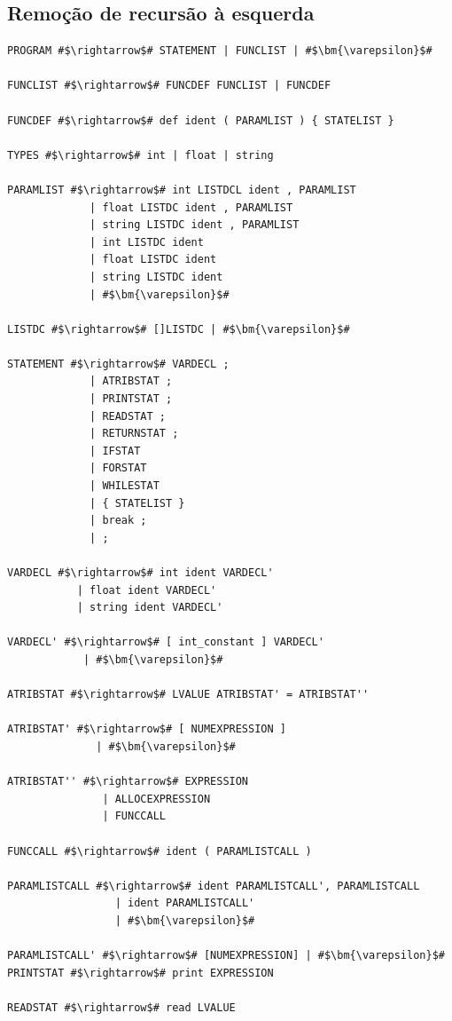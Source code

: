 \documentclass[
	12pt,				%
	openright,			%
	twoside,			%
	a4paper,			%
	english,			%
	french,				%
	spanish,			%
	brazil				%
	]{abntex2}
\begin{document}
\subsection{Remoção de recursão à esquerda}
\begin{lstlisting}[escapechar=\#]
PROGRAM #$\rightarrow$# STATEMENT | FUNCLIST | #$\bm{\varepsilon}$# 

FUNCLIST #$\rightarrow$# FUNCDEF FUNCLIST | FUNCDEF 

FUNCDEF #$\rightarrow$# def ident ( PARAMLIST ) { STATELIST } 

TYPES #$\rightarrow$# int | float | string 

PARAMLIST #$\rightarrow$# int LISTDCL ident , PARAMLIST 
             | float LISTDC ident , PARAMLIST 
             | string LISTDC ident , PARAMLIST 
             | int LISTDC ident  
             | float LISTDC ident 
             | string LISTDC ident 
             | #$\bm{\varepsilon}$# 

LISTDC #$\rightarrow$# []LISTDC | #$\bm{\varepsilon}$# 

STATEMENT #$\rightarrow$# VARDECL ; 
             | ATRIBSTAT ; 
             | PRINTSTAT ; 
             | READSTAT ; 
             | RETURNSTAT ; 
             | IFSTAT 
             | FORSTAT 
             | WHILESTAT 
             | { STATELIST } 
             | break ; 
             | ; 

VARDECL #$\rightarrow$# int ident VARDECL' 
           | float ident VARDECL' 
           | string ident VARDECL' 

VARDECL' #$\rightarrow$# [ int_constant ] VARDECL' 
            | #$\bm{\varepsilon}$# 

ATRIBSTAT #$\rightarrow$# LVALUE ATRIBSTAT' = ATRIBSTAT'' 

ATRIBSTAT' #$\rightarrow$# [ NUMEXPRESSION ] 
              | #$\bm{\varepsilon}$# 

ATRIBSTAT'' #$\rightarrow$# EXPRESSION 
               | ALLOCEXPRESSION 
               | FUNCCALL 

FUNCCALL #$\rightarrow$# ident ( PARAMLISTCALL ) 

PARAMLISTCALL #$\rightarrow$# ident PARAMLISTCALL', PARAMLISTCALL 
                 | ident PARAMLISTCALL'
                 | #$\bm{\varepsilon}$# 

PARAMLISTCALL' #$\rightarrow$# [NUMEXPRESSION] | #$\bm{\varepsilon}$#
PRINTSTAT #$\rightarrow$# print EXPRESSION 

READSTAT #$\rightarrow$# read LVALUE 


\end{lstlisting}
\end{document}
